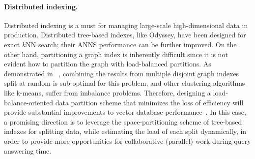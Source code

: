 \documentclass[11pt]{article}
\begin{document}




\paragraph{Distributed indexing.}
Distributed indexing is a must for managing large-scale high-dimensional data in production.
Distributed tree-based indexes, like Odyssey, have been designed for exact $k$NN search; their ANNS performance can be further improved. %
On the other hand, partitioning a graph index is inherently difficult since it is not evident how to partition the graph with load-balanced partitions.
As demonstrated in ~\cite{leqat}, combining the results from multiple disjoint graph indexes split at random is sub-optimal for this problem, and other clustering algorithms like k-means, suffer from imbalance problems.
Therefore, designing a load-balance-oriented data partition scheme that minimizes the loss of efficiency will provide substantial improvements to vector database performance~\cite{milvus,adbv,pinecone}.
In this case, a promising direction is to leverage the space-partitioning scheme of tree-based indexes for splitting data, while estimating the load of each split dynamically, in order to provide more opportunities for collaborative (parallel) work during query answering time. 
\end{document}
